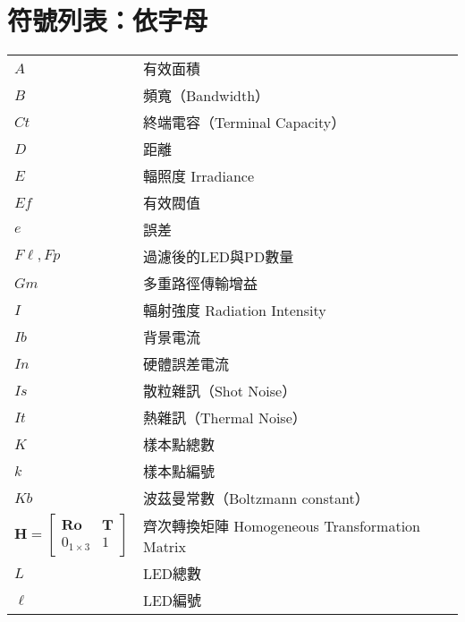 \chapter*{符號列表：依字母}
\label{chp:symbol_alphabet}




\begin{longtable}[l]{ll}
    $A$ & 有效面積\\
    $B$& 頻寬（Bandwidth）\\
    $Ct$ &終端電容（Terminal Capacity）\\
    $D$&距離\\

    $E$ & 輻照度 Irradiance\\
    $Ef$&有效閥值\\
    $e$&誤差\\
    $F\ell,Fp$ & 過濾後的LED與PD數量\\
    $Gm$&多重路徑傳輸增益\\

    $I$ & 輻射強度 Radiation Intensity\\
    $Ib$&背景電流\\
    $In$&硬體誤差電流\\
    $Is$&散粒雜訊（Shot Noise）\\
    $It$&熱雜訊（Thermal Noise）\\

    $K$&樣本點總數\\
    $k$&樣本點編號\\
    $Kb$&波茲曼常數（Boltzmann constant）\\

    $\boldsymbol{H}=\left[\begin{array}{cc}
        \boldsymbol{Ro}  & \boldsymbol{T} \\
        0_{1\times3} & 1
        \end{array}\right]$ & 齊次轉換矩陣 Homogeneous Transformation Matrix\\
        
    $L$ & LED總數\\
    $\ell$ & LED編號\\


\end{longtable}
